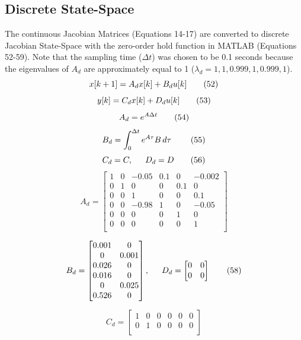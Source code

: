 \documentclass[conference]{IEEEtran}
\begin{document}
\subsection{Discrete State-Space}
The continuous Jacobian Matrices (Equations 14-17) are converted to discrete Jacobian State-Space with the zero-order hold function in MATLAB (Equations 52-59). Note that the sampling time ($\Delta t$) was chosen to be 0.1 seconds because the eigenvalues of $A_d$ are approximately equal to 1 ($\lambda_{d} = 1, 1, 0.999, 1, 0.999, 1$). \\  
\[
x[k+1] = A_dx[k] + B_du[k] \tag{52} \\
\]
\[
y[k] = C_dx[k] + D_du[k] \tag{53}\\
\]
\[
A_d = e^{A\Delta t} \tag{54}\\
\]
\[
B_d =  \int_{0}^{\Delta t} e^{A\tau}B\,d\tau\  \tag{55}\\
\]
\[
C_d = C, \indent D_d = D \tag{56}\\
\]
\[
A_d = 
\begin{bmatrix}
1 &0 &-0.05 &0.1 &0 &-0.002\\
0 &1 &0 &0 &0.1 &0\\
0 &0 &1 &0 &0 &0.1\\
0 &0 &-0.98 &1 &0 &-0.05\\
0 &0 &0 &0 &1 &0\\
0 &0 &0 &0 &0 &1\\
\end{bmatrix}
\tag{57}
\]

\[
B_d = 
\begin{bmatrix}
0.001&0\\
0 &0.001\\
0.026 &0\\
0.016& 0\\
 0&0.025\\
0.526& 0\\
\end{bmatrix}, \indent
D_d =
\begin{bmatrix}
0&0\\
0&0\\
\end{bmatrix}
\tag{58}
\] 

\[
C_d = 
\begin{bmatrix}
1&0&0&0&0&0\\
0&1&0&0&0&0\\
\end{bmatrix}
\tag{59}
\]
\\
\end{document}
